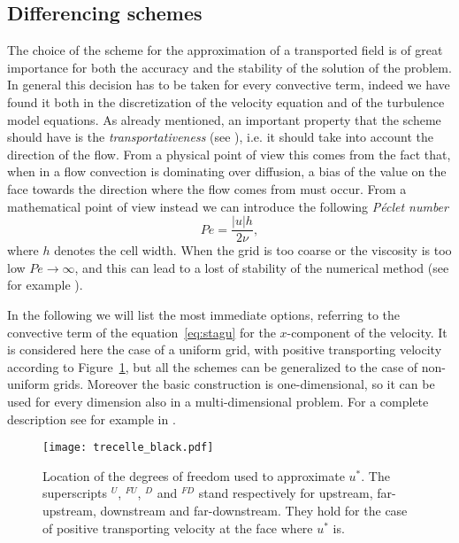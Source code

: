 \subsection{Differencing schemes} \label{subsec:diffscheme} %
The choice of the scheme for the approximation of a transported field is of 
great importance for both the accuracy and the stability of the solution of the 
problem. In general this decision has to be taken for every convective term, 
indeed we have found it both in the discretization of the velocity 
equation and of the turbulence model equations. As already mentioned, an 
important property that the scheme should have is the \emph{transportativeness} 
(see \cite{main:vermal}), i.e. it should take into account the direction of the 
flow. From a physical point of view this comes from the fact that, when in a 
flow convection is dominating over diffusion, a bias of the value on the face 
towards the direction where the flow comes from must occur. From a mathematical 
point of view instead we can introduce the following \emph{Péclet number}
\begin{equation}
	Pe = \frac{|u| h}{2\nu},
\end{equation}
where $h$ denotes the cell width. When the grid is too coarse or the viscosity 
is too low $Pe\rightarrow\infty$, and this can lead to a lost of stability of 
the numerical method (see for example \cite{main:quarteroni}).

In the following we will list the most immediate options, referring to the 
convective term of the equation~\eqref{eq:stagu} for the $x$-component of the 
velocity. It is considered here the case of a uniform grid, with positive 
transporting velocity according to 
Figure~\ref{fig:superscripts}, but all the schemes can be generalized to the 
case of non-uniform grids. Moreover the basic construction is one-dimensional, 
so it can be used for every dimension also in a multi-dimensional problem. For 
a complete description see for example in \cite{main:vermal}.
\begin{figure}
	\centering
	\texttt{[image: trecelle\_black.pdf]}
	\caption[Location of the degrees of freedom used to approximate 
	$u^*$]{Location of the degrees of freedom used to approximate $u^*$. The 
	superscripts $^U$, $^{FU}$, $^D$ and $^{FD}$ stand respectively for 
	upstream, far-upstream, downstream and far-downstream. They hold for the 
	case of positive transporting velocity at the face where $u^*$ is.}
	\label{fig:superscripts}
\end{figure}
